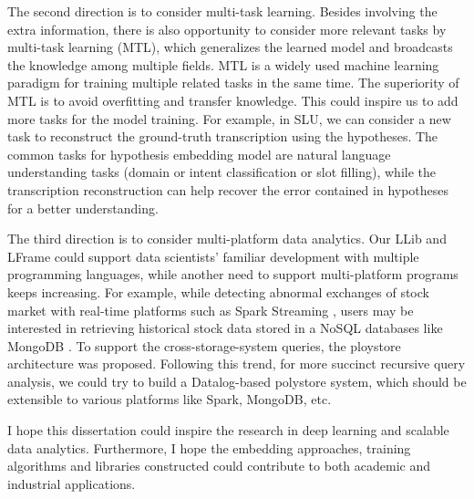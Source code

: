 \documentclass [PhD] {uclathes}
\begin{document}
The second direction is to consider multi-task learning.  Besides involving the extra information, there is also opportunity to consider more relevant tasks by multi-task learning (MTL),  which generalizes the learned model and broadcasts the knowledge among multiple fields. MTL \citep{zhang2017survey,liu2019multi,caruana1997multitask} is a widely used machine learning paradigm for training multiple related tasks in the same time. The superiority of MTL is to avoid  overfitting and transfer knowledge. This could inspire us to add more tasks for the model training. For example, in  SLU,  we can consider a new task to reconstruct the ground-truth transcription using the hypotheses.  The common tasks for hypothesis embedding model are natural language understanding tasks (domain or intent classification or slot filling), while the transcription reconstruction can help recover the error contained in hypotheses for a better understanding.

The third direction is to consider multi-platform data analytics.  Our LLib and LFrame could support data scientists' familiar development with multiple programming languages, while another need to support multi-platform programs keeps increasing. For example, while detecting abnormal exchanges of stock market with real-time platforms such as Spark Streaming \citep{zaharia2013discretized}, users may be interested in retrieving historical stock data stored in a NoSQL databases like MongoDB \citep{chodorow2013mongodb}. To support the cross-storage-system queries, the ploystore \citep{duggan2015bigdawg} architecture was proposed. Following this trend, for more succinct recursive query analysis, we could try to build a Datalog-based polystore system, which should be extensible to various platforms like Spark, MongoDB, etc.

I hope this dissertation could inspire the research in deep learning and scalable  data analytics. Furthermore, I hope the embedding approaches, training algorithms and libraries constructed could contribute to both academic and industrial applications. 




{}


\end{document}
